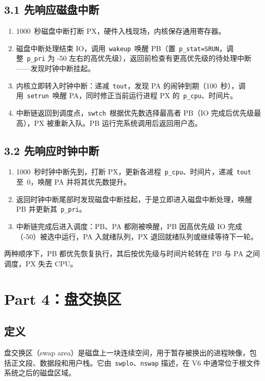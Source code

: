 \documentclass[11pt]{article}
\begin{document}
\subsection*{3.1 先响应磁盘中断}
\begin{enumerate}
  \item 1000~秒磁盘中断打断 PX，硬件入栈现场，内核保存通用寄存器。
  \item 磁盘中断处理结束 IO，调用~\verb|wakeup|~唤醒 PB（置~\verb|p_stat=SRUN|，调整~\verb|p_pri| 为 -50 左右的高优先级），返回前检查有更高优先级的待处理中断——发现时钟中断挂起。
  \item 内核立即转入时钟中断：递减~\verb|tout|，发现 PA 的闹钟到期（100~秒），调用~\verb|setrun|~唤醒 PA，同时修正当前运行进程 PX 的~\verb|p_cpu|、时间片。
  \item 中断链返回到调度点，\verb|swtch|~根据优先数选择最高者 PB（IO 完成后优先级最高），PX 被重新入队。PB 运行完系统调用后返回用户态。
\end{enumerate}

\subsection*{3.2 先响应时钟中断}
\begin{enumerate}
  \item 1000~秒时钟中断先到，打断 PX，更新各进程~\verb|p_cpu|、时间片，递减~\verb|tout| 至~0，唤醒 PA 并将其优先数提升。
  \item 返回时钟中断尾部时发现磁盘中断挂起，于是立即进入磁盘中断处理，唤醒 PB 并更新其~\verb|p_pri|。
  \item 中断链完成后进入调度：PB、PA 都刚被唤醒，PB 因高优先级 IO 完成（-50）被选中运行，PA 入就绪队列，PX 退回就绪队列或继续等待下一轮。
\end{enumerate}

两种顺序下，PB 都优先恢复执行，其后按优先级与时间片轮转在 PB 与 PA 之间调度，PX 失去 CPU。

\section*{Part 4：盘交换区}
\subsection*{定义}
盘交换区（swap area）是磁盘上一块连续空间，用于暂存被换出的进程映像，包括正文段、数据段和用户栈。它由~\verb|swplo|、\verb|nswap| 描述，在 V6 中通常位于根文件系统之后的磁盘区域。
\end{document}
